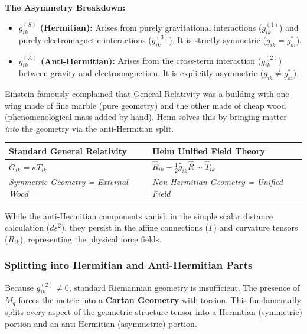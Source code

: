 \documentclass[11pt,a4paper,oneside]{article}
\begin{document}
\textbf{The Asymmetry Breakdown:}
\begin{itemize}
    \item \textbf{$g_{ik}^{(S)}$ (Hermitian):} Arises from purely gravitational interactions ($g_{ik}^{(1)}$) and purely electromagnetic interactions ($g_{ik}^{(3)}$). It is strictly symmetric ($g_{ik} = g_{ki}^*$).
    \item \textbf{$g_{ik}^{(A)}$ (Anti-Hermitian):} Arises from the cross-term interaction ($g_{ik}^{(2)}$) between gravity and electromagnetism. It is explicitly asymmetric ($g_{ik} \neq g_{ki}^*$).
\end{itemize}

\begin{tcolorbox}[colback=white, colframe=theorygray, title=\textbf{Einstein's "Wood vs. Marble" Dilemma Resolved}]
Einstein famously complained that General Relativity was a building with one wing made of fine marble (pure geometry) and the other made of cheap wood (phenomenological mass added by hand). Heim solves this by bringing matter \textit{into} the geometry via the anti-Hermitian split.

\vspace{0.5em}
\begin{tabular}{p{7cm} | p{7cm}}
\textbf{Standard General Relativity} & \textbf{Heim Unified Field Theory} \\
\midrule
$G_{ik} = \kappa T_{ik}$ & $\hat{R}_{ik} - \frac{1}{2}\hat{g}_{ik}\hat{R} \sim \hat{T}_{ik}$ \\
\textit{Symmetric Geometry = External Wood} & \textit{Non-Hermitian Geometry = Unified Field} \\
\end{tabular}
\end{tcolorbox}

While the anti-Hermitian components vanish in the simple scalar distance calculation ($ds^2$), they persist in the affine connections ($\Gamma$) and curvature tensors ($R_{ik}$), representing the physical force fields.

\subsubsection{Splitting into Hermitian and Anti-Hermitian Parts}

Because $g_{ik}^{(2)} \neq 0$, standard Riemannian geometry is insufficient. The presence of $M_q$ forces the metric into a \textbf{Cartan Geometry} with torsion. This fundamentally splits every aspect of the geometric structure tensor into a Hermitian (symmetric) portion and an anti-Hermitian (asymmetric) portion.
\end{document}
